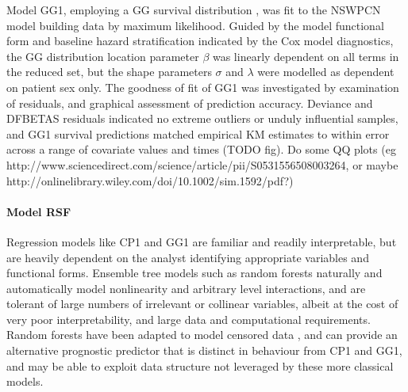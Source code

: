\documentclass[dissertation.tex]{subfiles}
\begin{document}
Model GG1, employing a \gls{GG} survival distribution \cite{Cox2007}, was fit to the \gls{NSWPCN} model building data by maximum likelihood.  Guided by the model functional form and baseline hazard stratification indicated by the Cox model diagnostics, the \gls{GG} distribution location parameter $\beta$ was linearly dependent on all terms in the reduced set, but the shape parameters $\sigma$ and $\lambda$ were modelled as dependent on patient sex only.  The goodness of fit of GG1 was investigated by examination of residuals, and graphical assessment of prediction accuracy.  Deviance and DFBETAS residuals indicated no extreme outliers or unduly influential samples, and GG1 survival predictions matched empirical \gls{KM} estimates to within error across a range of covariate values and times \fref(TODO fig).  Do some QQ plots (eg http://www.sciencedirect.com/science/article/pii/S0531556508003264, or maybe http://onlinelibrary.wiley.com/doi/10.1002/sim.1592/pdf?)

\paragraph{Model RSF}
Regression models like CP1 and GG1 are familiar and readily interpretable, but are heavily dependent on the analyst identifying appropriate variables and functional forms.  Ensemble tree models such as random forests \cite{Breiman2001} naturally and automatically model nonlinearity and arbitrary level interactions, and are tolerant of large numbers of irrelevant or collinear variables, albeit at the cost of very poor interpretability, and large data and computational requirements.  Random forests have been adapted to model censored data \cite{Ishwaran2008}, and can provide an alternative prognostic predictor that is distinct in behaviour from CP1 and GG1, and may be able to exploit data structure not leveraged by these more classical models.
\end{document}
